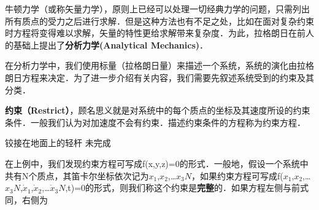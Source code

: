 
\begin{issues}
\issueDraft
\issueTODO
\end{issues}


牛顿力学（或称矢量力学），原则上已经可以处理一切经典力学的问题，只需列出所有质点的受力之后进行求解．但是这种方法也有不足之处，比如在面对复杂约束时方程将变得难以求解，矢量的特性更给求解带来复杂度．为此，拉格朗日在前人的基础上提出了\textbf{分析力学(Analytical Mechanics)}．

在分析力学中，我们使用标量（拉格朗日量）来描述一个系统，系统的演化由拉格朗日方程来决定．为了进一步介绍有关内容，我们需要先叙述系统受到的约束及其分类．

\textbf{约束（Restrict）}，顾名思义就是对系统中的每个质点的坐标及其速度所设的约束条件．一般我们认为对加速度不会有约束．描述约束条件的方程称为约束方程．

\begin{example}{铰接在地面上的轻杆}
未完成
\end{example}

在上例中，我们发现约束方程可写成f(x,y,z)=0的形式．一般地，假设一个系统中共有N个质点，其笛卡尔坐标依次记为$x
_1$,$x_2$,…$x_3N$，如果约束方程可写成f($x_1$,$x_2$,…$x_3N$,$\dot x_1$,$\dot x_2$,…$\dot x_3N$,t)=0的形式，则我们称这个约束是\textbf{完整}的．如果方程左侧与前式同，右侧为